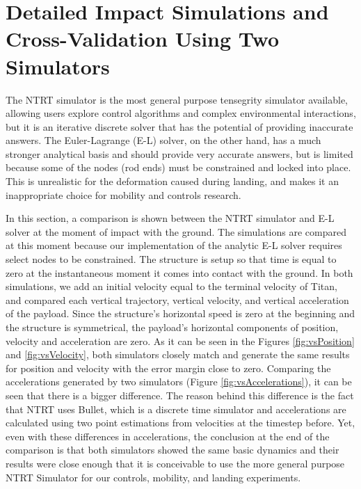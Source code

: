 \section{Detailed Impact Simulations and Cross-Validation Using Two Simulators}
The NTRT simulator is the most general purpose tensegrity simulator available, allowing users explore control algorithms and complex environmental interactions, but it is an iterative discrete solver that has the potential of providing inaccurate answers.  The Euler-Lagrange (E-L) solver, on the other hand, has a much stronger analytical basis and should provide very accurate answers, but is limited because some of the nodes (rod ends) must be constrained and locked into place.  This is unrealistic for the deformation caused during landing, and makes it an inappropriate choice for mobility and controls research.

In this section, a comparison is shown between the NTRT simulator and E-L solver at the moment of impact with the ground. 
The simulations are compared at this moment because our implementation of the analytic E-L solver requires select nodes to be constrained.
The structure is setup so that time is equal to zero at the instantaneous moment it comes into contact with the ground. 
In both simulations, we add an initial velocity equal to the terminal velocity of Titan, and compared each vertical trajectory, vertical velocity, and vertical acceleration of the payload. 
Since the structure's horizontal speed is zero at the beginning and the structure is symmetrical, the payload's horizontal components of position, velocity and acceleration are zero. 
As it can be seen in the Figures \ref{fig:vsPosition} and \ref{fig:vsVelocity}, both simulators closely match and generate the same results for position and velocity with the error margin close to zero. 
Comparing the accelerations generated by two simulators (Figure \ref{fig:vsAccelerations}), it can be seen that there is a bigger difference. 
The reason behind this difference is the fact that NTRT uses Bullet, which is a discrete time simulator and accelerations are calculated using two point estimations from velocities at the timestep before.  Yet, even with these differences in accelerations, the conclusion at the end of the comparison is that both simulators showed the same basic dynamics and their results were close enough that it is conceivable to use the more general purpose NTRT Simulator for our controls, mobility, and landing experiments.


